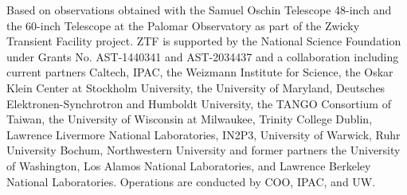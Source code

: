 \documentclass[twocolumn, tighten, astrosymb]{aastex631}
\begin{document}


\begin{acknowledgments} 
Based on observations obtained with the Samuel Oschin Telescope 48-inch and the 60-inch Telescope at the Palomar Observatory as part of the Zwicky Transient Facility project. ZTF is supported by the National Science Foundation under Grants No. AST-1440341 and AST-2034437 and a collaboration including current partners Caltech, IPAC, the Weizmann Institute for Science, the Oskar Klein Center at Stockholm University, the University of Maryland, Deutsches Elektronen-Synchrotron and Humboldt University, the TANGO Consortium of Taiwan, the University of Wisconsin at Milwaukee, Trinity College Dublin, Lawrence Livermore National Laboratories, IN2P3, University of Warwick, Ruhr University Bochum, Northwestern University and former partners the University of Washington, Los Alamos National Laboratories, and Lawrence Berkeley National Laboratories. Operations are conducted by COO, IPAC, and UW.
\end{acknowledgments}
\end{document}
